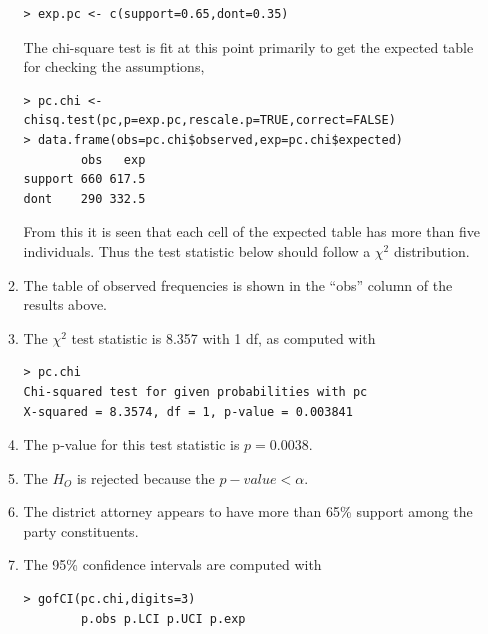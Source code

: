 \documentclass[10pt,openany]{book}\usepackage[]{graphicx}\usepackage[]{color}
\makeatletter
\newenvironment{kframe}{%
 \def\at@end@of@kframe{}%
 \ifinner\ifhmode%
  \def\at@end@of@kframe{\end{minipage}}%
  \begin{minipage}{\columnwidth}%
 \fi\fi%
 \def\FrameCommand##1{\hskip\@totalleftmargin \hskip-\fboxsep
 \colorbox{shadecolor}{##1}\hskip-\fboxsep
     \hskip-\linewidth \hskip-\@totalleftmargin \hskip\columnwidth}%
 \MakeFramed {\advance\hsize-\width
   \@totalleftmargin\z@ \linewidth\hsize
   \@setminipage}}%
 {\par\unskip\endMakeFramed%
 \at@end@of@kframe}
\newenvironment{knitrout}{}{} %
\makeatother
\begin{document}
\begin{itemize}
\begin{enumerate}
\begin{knitrout}
\begin{kframe}
\begin{verbatim}
> exp.pc <- c(support=0.65,dont=0.35)
\end{verbatim}
\end{kframe}
\end{knitrout}
The chi-square test is fit at this point primarily to get the expected table for checking the assumptions,
\begin{knitrout}
\color{fgcolor}\begin{kframe}
\begin{verbatim}
> pc.chi <- chisq.test(pc,p=exp.pc,rescale.p=TRUE,correct=FALSE)
> data.frame(obs=pc.chi$observed,exp=pc.chi$expected)
        obs   exp
support 660 617.5
dont    290 332.5
\end{verbatim}
\end{kframe}
\end{knitrout}
From this it is seen that each cell of the expected table has more than five individuals.  Thus the test statistic below should follow a $\chi^{2}$ distribution.
      \item The table of observed frequencies is shown in the ``obs'' column of the results above.
      \item The $\chi^{2}$ test statistic is 8.357 with 1 df, as computed with
\begin{knitrout}
\color{fgcolor}\begin{kframe}
\begin{verbatim}
> pc.chi
Chi-squared test for given probabilities with pc 
X-squared = 8.3574, df = 1, p-value = 0.003841
\end{verbatim}
\end{kframe}
\end{knitrout}
      \item The p-value for this test statistic is $p=0.0038$.
      \item The $H_{O}$ is rejected because the $p-value<\alpha$.
      \item The district attorney appears to have more than 65\% support among the party constituents.
      \item The 95\% confidence intervals are computed with
\begin{knitrout}
\color{fgcolor}\begin{kframe}
\begin{verbatim}
> gofCI(pc.chi,digits=3)
        p.obs p.LCI p.UCI p.exp

\end{verbatim}
\end{kframe}
\end{knitrout}
\end{enumerate}
\end{itemize}
\end{document}
